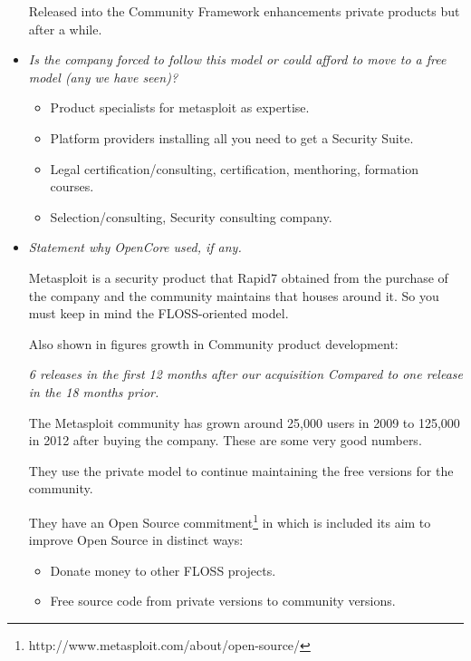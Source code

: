 \documentclass[11pt]{scrartcl}
\begin{document}
\begin{itemize}
    Released into the Community Framework enhancements private products but after a while.

\item \emph{Is the company forced to follow this model or could afford to move to a free model (any we have seen)?}

    \begin{itemize}
        \item Product specialists for metasploit as expertise.
        \item Platform providers installing all you need to get a Security Suite.
        \item Legal certification/consulting, certification, menthoring, formation courses.
        \item Selection/consulting, Security consulting company.
    \end{itemize}

\item \emph{Statement why OpenCore used, if any.}

    \par Metasploit is a security product that Rapid7 obtained from the purchase of the company and the community maintains that houses around it. So you must keep in mind the FLOSS-oriented model.

    \par Also shown in figures growth in Community product development:

    \emph{6 releases in the first 12 months after our acquisition Compared to one release in the 18 months prior.}

    \par The Metasploit community has grown around 25,000 users in 2009 to 125,000 in 2012 after buying the company. These are some very good numbers.

    \par They use the private model to continue maintaining the free versions for the community.

    \par They have an Open Source commitment\footnote{http://www.metasploit.com/about/open-source/} in which is included its aim to improve Open Source in distinct ways:

        \begin{itemize}
            \item Donate money to other FLOSS projects.
            \item Free source code from private versions to community versions.
        \end{itemize}


\end{itemize}
\end{document}
